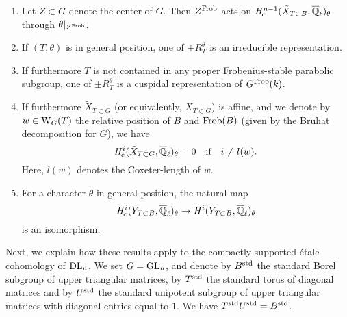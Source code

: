 \documentclass[../main.tex]{subfiles}
\begin{document}
\begin{thm}\label{thm:DLTheoryGeneralResults}
  \leavevmode
  \begin{enumerate}
      \item \textnormal{\cite[Corollary 1.22]{delignelusztig1976}} Let $Z \subset G$
        denote the center of $G$. Then $Z^{\mathrm{Frob}}$ acts on $\mathit H_{\mathrm{c}}^{n-1}(\tilde
        X_{T \subset B}, \overline {\mathbb{Q}}_\ell)_{\theta}$ through $\theta|_{Z^{\mathrm{Frob}}}$.
      \item \textnormal{\cite[Corollary 7.3]{delignelusztig1976}} If 
        $(T, \theta)$ is in general position, one of $\pm R_T^\theta$ is an 
        irreducible representation.
      \item \textnormal{\cite[Corollary 8.3]{delignelusztig1976}} If furthermore
        $T$ is not contained in any proper Frobenius-stable parabolic subgroup,
        one of $\pm R^\theta_T$ is a cuspidal representation of $G^{\mathrm{Frob}}(k)$.
      \item \textnormal{\cite[Corollary 9.9]{delignelusztig1976}} If furthermore
        $\tilde X_{T \subset G}$ (or equivalently, $X_{T \subset G}$) is affine, 
        and we denote by $w \in \mathrm W_G(T)$ the relative position of $B$ and
        $\mathrm{Frob}(B)$ (given by the Bruhat decomposition for $G$),
        we have $$\mathit H_{\mathrm{c}}^i(\tilde X_{T \subset G}, \overline {\mathbb{Q}}_\ell)_\theta = 0 \quad \text{if}
        \quad i \neq l(w).$$
        Here, $l(w)$ denotes the Coxeter-length of $w$.
      \item \textnormal{\cite[Theorem 9.8]{delignelusztig1976}} For a character 
        $\theta$ in general position, the natural map
        \begin{equation*}
          \mathit H_{\mathrm{c}}^i(Y_{T \subset B},\overline {\mathbb{Q}}_\ell)_\theta \to \mathit H^i(Y_{T \subset
          B}, \overline {\mathbb{Q}}_\ell)_\theta
        \end{equation*}
        is an isomorphism.
    \end{enumerate}
\end{thm}

Next, we explain how these results apply to the compactly supported \'etale cohomology
of $\mathrm{DL}_n$. We set $G = \operatorname{GL}_n$, and denote by $B^{\mathrm{std}}$ the standard Borel
subgroup of upper triangular matrices, by $T^{\mathrm{std}}$ the standard torus of
diagonal matrices
and by $U^{\mathrm{std}}$ the standard unipotent subgroup of upper triangular matrices with
diagonal entries equal to $1$. We have $T^{\mathrm{std}} U^{\mathrm{std}} = B^{\mathrm{std}}$. 
\end{document}
